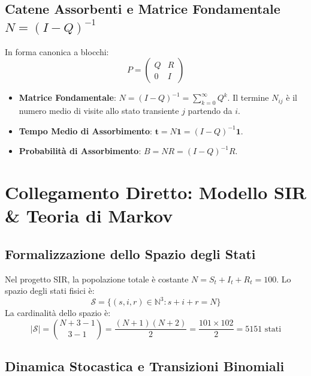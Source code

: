 \documentclass[11pt, a4paper]{report}
\theoremstyle{plain}
\theoremstyle{definition}
\theoremstyle{remark}
\newcommand{\N}{\mathbb{N}}
\newcommand{\1}{\mathbf{1}}
\begin{document}
\section{Catene Assorbenti e Matrice Fondamentale \texorpdfstring{$N = (I-Q)^{-1}$}{N = (I-Q)\textasciicircum(-1)}}

In forma canonica a blocchi:
\[ P = \begin{pmatrix} Q & R \\ 0 & I \end{pmatrix} \]
\begin{itemize}
    \item \textbf{Matrice Fondamentale}: $N = (I-Q)^{-1} = \sum_{k=0}^\infty Q^k$. Il termine $N_{ij}$ è il numero medio di visite allo stato transiente $j$ partendo da $i$.
    \item \textbf{Tempo Medio di Assorbimento}: $\mathbf{t} = N \mathbf{1} = (I-Q)^{-1}\mathbf{1}$.
    \item \textbf{Probabilità di Assorbimento}: $B = N R = (I-Q)^{-1}R$.
\end{itemize}

\newpage

\chapter{Collegamento Diretto: Modello SIR \& Teoria di Markov}

\section{Formalizzazione dello Spazio degli Stati}

Nel progetto SIR, la popolazione totale è costante $N = S_t + I_t + R_t = 100$.
Lo spazio degli stati fisici è:
\[ \mathcal{S} = \{ (s, i, r) \in \N^3 : s + i + r = N \} \]
La cardinalità dello spazio è:
\[ |\mathcal{S}| = \binom{N+3-1}{3-1} = \frac{(N+1)(N+2)}{2} = \frac{101 \times 102}{2} = 5151 \text{ stati} \]

\section{Dinamica Stocastica e Transizioni Binomiali}
\end{document}
